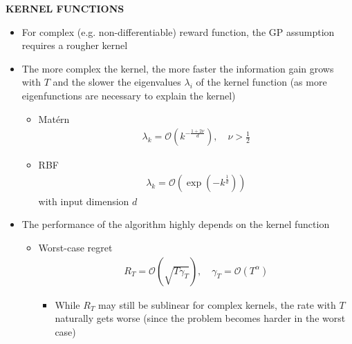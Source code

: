 \begin{whitebox}{\textbf{KERNEL FUNCTIONS}}
    \begin{itemize}
        \item For complex (e.g. non-differentiable) reward function, the GP assumption requires a rougher kernel
        \item The more complex the kernel, the more faster the information gain grows with $T$ and the slower the eigenvalues $\lambda_i$ of the kernel function (as more eigenfunctions are necessary to explain the kernel)
        \begin{itemize}
            \item Matérn
            \begin{align*}
                \lambda_k=\mathcal{O}(k^{-\frac{1+2\nu}{d}}),\quad \nu>\frac{1}{2}
            \end{align*}
            \item RBF
            \begin{align*}
                \lambda_k=\mathcal{O}(\exp(-k^{\frac{1}{d}}))
            \end{align*}
            with input dimension $d$
            \begin{center}
            \end{center}
        \end{itemize}
        \item The performance of the algorithm highly depends on the kernel function
        \begin{itemize}
            \item Worst-case regret
            \begin{align*}
                R_T=\mathcal{O}(\sqrt{T\gamma_T}),\quad\gamma_T=\mathcal{O}(T^\alpha)
            \end{align*}
            \begin{itemize}
                \item While $R_T$ may still be sublinear for complex kernels, the rate with $T$ naturally gets worse (since the problem becomes harder in the worst case)
                \begin{center}
                    \resizebox{0.90\linewidth}{!}{
                        \includegraphics[
}
\end{center}
\end{itemize}
\end{itemize}
\end{itemize}
\end{whitebox}
